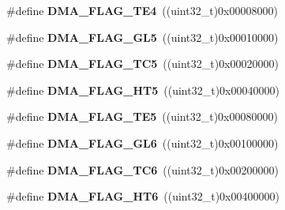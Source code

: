 \begin{DoxyCompactItemize}
\item 
\hypertarget{group___d_m_a__flag__definitions_gab1bb20d71697de115b87319347216a26}{\#define {\bfseries D\-M\-A\-\_\-\-F\-L\-A\-G\-\_\-\-T\-E4}~((uint32\-\_\-t)0x00008000)}\label{group___d_m_a__flag__definitions_gab1bb20d71697de115b87319347216a26}

\item 
\hypertarget{group___d_m_a__flag__definitions_ga78246e9a0d30e63e4fe5a54207c41a3e}{\#define {\bfseries D\-M\-A\-\_\-\-F\-L\-A\-G\-\_\-\-G\-L5}~((uint32\-\_\-t)0x00010000)}\label{group___d_m_a__flag__definitions_ga78246e9a0d30e63e4fe5a54207c41a3e}

\item 
\hypertarget{group___d_m_a__flag__definitions_ga2e3a81f03ed107dbb60cfa7560c32e97}{\#define {\bfseries D\-M\-A\-\_\-\-F\-L\-A\-G\-\_\-\-T\-C5}~((uint32\-\_\-t)0x00020000)}\label{group___d_m_a__flag__definitions_ga2e3a81f03ed107dbb60cfa7560c32e97}

\item 
\hypertarget{group___d_m_a__flag__definitions_ga3f7bd37a3c6a833a5e8dd011f7ef9acd}{\#define {\bfseries D\-M\-A\-\_\-\-F\-L\-A\-G\-\_\-\-H\-T5}~((uint32\-\_\-t)0x00040000)}\label{group___d_m_a__flag__definitions_ga3f7bd37a3c6a833a5e8dd011f7ef9acd}

\item 
\hypertarget{group___d_m_a__flag__definitions_ga04a05f5cc8f193757d8658d97a857b3a}{\#define {\bfseries D\-M\-A\-\_\-\-F\-L\-A\-G\-\_\-\-T\-E5}~((uint32\-\_\-t)0x00080000)}\label{group___d_m_a__flag__definitions_ga04a05f5cc8f193757d8658d97a857b3a}

\item 
\hypertarget{group___d_m_a__flag__definitions_ga2ea0eb984d33f6788a59f49dcd2acee0}{\#define {\bfseries D\-M\-A\-\_\-\-F\-L\-A\-G\-\_\-\-G\-L6}~((uint32\-\_\-t)0x00100000)}\label{group___d_m_a__flag__definitions_ga2ea0eb984d33f6788a59f49dcd2acee0}

\item 
\hypertarget{group___d_m_a__flag__definitions_ga1e3da05635b4165ce2a0075646cc9131}{\#define {\bfseries D\-M\-A\-\_\-\-F\-L\-A\-G\-\_\-\-T\-C6}~((uint32\-\_\-t)0x00200000)}\label{group___d_m_a__flag__definitions_ga1e3da05635b4165ce2a0075646cc9131}

\item 
\hypertarget{group___d_m_a__flag__definitions_ga37e18ea9dab110bafc8de3b6aedabb02}{\#define {\bfseries D\-M\-A\-\_\-\-F\-L\-A\-G\-\_\-\-H\-T6}~((uint32\-\_\-t)0x00400000)}\label{group___d_m_a__flag__definitions_ga37e18ea9dab110bafc8de3b6aedabb02}


\end{DoxyCompactItemize}
